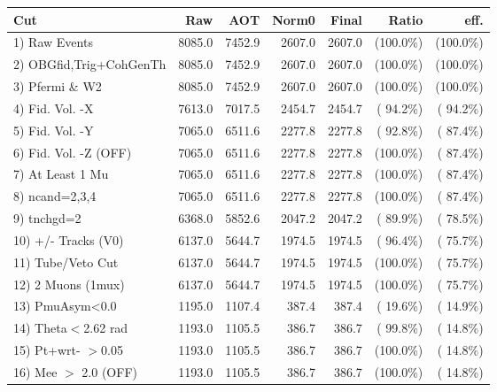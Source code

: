  \begin{table}[h!]\centering
 \begin{tabular}{||l||r|r|r|r|r|r||}
 \hline
 \hline
 Cut & Raw & AOT & Norm0 & Final & Ratio & eff.       \\
 \hline
  1) Raw Events           &       8085.0 &       7452.9 &       2607.0 &       2607.0 & (100.0\%) & (100.0\%) \\
  2) OBGfid,Trig+CohGenTh &       8085.0 &       7452.9 &       2607.0 &       2607.0 & (100.0\%) & (100.0\%) \\
  3) Pfermi \& W2         &       8085.0 &       7452.9 &       2607.0 &       2607.0 & (100.0\%) & (100.0\%) \\
  4) Fid. Vol. -X         &       7613.0 &       7017.5 &       2454.7 &       2454.7 & ( 94.2\%) & ( 94.2\%) \\
  5) Fid. Vol. -Y         &       7065.0 &       6511.6 &       2277.8 &       2277.8 & ( 92.8\%) & ( 87.4\%) \\
  6) Fid. Vol. -Z (OFF)   &       7065.0 &       6511.6 &       2277.8 &       2277.8 & (100.0\%) & ( 87.4\%) \\
  7) At Least 1 Mu        &       7065.0 &       6511.6 &       2277.8 &       2277.8 & (100.0\%) & ( 87.4\%) \\
  8) ncand=2,3,4          &       7065.0 &       6511.6 &       2277.8 &       2277.8 & (100.0\%) & ( 87.4\%) \\
  9) tnchgd=2             &       6368.0 &       5852.6 &       2047.2 &       2047.2 & ( 89.9\%) & ( 78.5\%) \\
 10) +/- Tracks (V0)      &       6137.0 &       5644.7 &       1974.5 &       1974.5 & ( 96.4\%) & ( 75.7\%) \\
 11) Tube/Veto Cut        &       6137.0 &       5644.7 &       1974.5 &       1974.5 & (100.0\%) & ( 75.7\%) \\
 12) 2 Muons (1mux)       &       6137.0 &       5644.7 &       1974.5 &       1974.5 & (100.0\%) & ( 75.7\%) \\
 13) PmuAsym<0.0          &       1195.0 &       1107.4 &        387.4 &        387.4 & ( 19.6\%) & ( 14.9\%) \\
 14) Theta$<$2.62 rad     &       1193.0 &       1105.5 &        386.7 &        386.7 & ( 99.8\%) & ( 14.8\%) \\
 15) Pt+wrt- $>$0.05      &       1193.0 &       1105.5 &        386.7 &        386.7 & (100.0\%) & ( 14.8\%) \\
 16) Mee $>$ 2.0  (OFF)   &       1193.0 &       1105.5 &        386.7 &        386.7 & (100.0\%) & ( 14.8\%) \\

\end{tabular}
\end{table}
